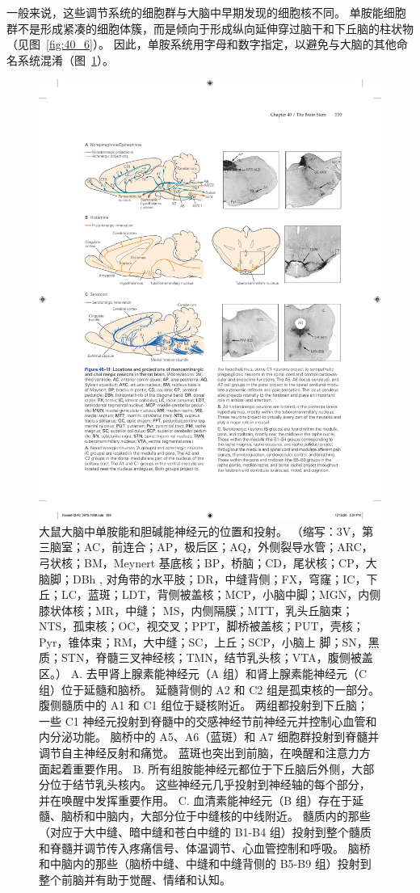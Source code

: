 一般来说，这些调节系统的细胞群与大脑中早期发现的细胞核不同。
单胺能细胞群不是形成紧凑的细胞体簇，而是倾向于形成纵向延伸穿过脑干和下丘脑的柱状物（见图~\ref{fig:40_6}）。
因此，单胺系统用字母和数字指定，以避免与大脑的其他命名系统混淆（图~\ref{fig:40_11}）。


\begin{figure}[htbp]
	\centering
	\includegraphics[width=0.95\linewidth]{chap40/fig_40_11}
	\caption{大鼠大脑中单胺能和胆碱能神经元的位置和投射。 （缩写：3V，第三脑室；AC，前连合；AP，极后区；AQ，外侧裂导水管；ARC，弓状核；BM，Meynert 基底核；BP，桥脑；CD，尾状核；CP，大脑脚；DBh , 对角带的水平肢；DR，中缝背侧；FX，穹窿；IC，下丘；LC，蓝斑；LDT，背侧被盖核；MCP，小脑中脚；MGN，内侧膝状体核；MR，中缝； MS，内侧隔膜；MTT，乳头丘脑束；NTS，孤束核；OC，视交叉；PPT，脚桥被盖核；PUT，壳核；Pyr，锥体束；RM，大中缝；SC，上丘；SCP，小脑上 脚；SN，黑质；STN，脊髓三叉神经核；TMN，结节乳头核；VTA，腹侧被盖区。） A. 去甲肾上腺素能神经元（A 组）和肾上腺素能神经元（C 组）位于延髓和脑桥。 延髓背侧的 A2 和 C2 组是孤束核的一部分。 腹侧髓质中的 A1 和 C1 组位于疑核附近。 两组都投射到下丘脑； 一些 C1 神经元投射到脊髓中的交感神经节前神经元并控制心血管和内分泌功能。 脑桥中的 A5、A6（蓝斑）和 A7 细胞群投射到脊髓并调节自主神经反射和痛觉。 蓝斑也突出到前脑，在唤醒和注意力方面起着重要作用。 B. 所有组胺能神经元都位于下丘脑后外侧，大部分位于结节乳头核内。 这些神经元几乎投射到神经轴的每个部分，并在唤醒中发挥重要作用。 C. 血清素能神经元（B 组）存在于延髓、脑桥和中脑内，大部分位于中缝核的中线附近。 髓质内的那些（对应于大中缝、暗中缝和苍白中缝的 B1-B4 组）投射到整个髓质和脊髓并调节传入疼痛信号、体温调节、心血管控制和呼吸。 脑桥和中脑内的那些（脑桥中缝、中缝和中缝背侧的 B5-B9 组）投射到整个前脑并有助于觉醒、情绪和认知。}
	\label{fig:40_11}
\end{figure}


